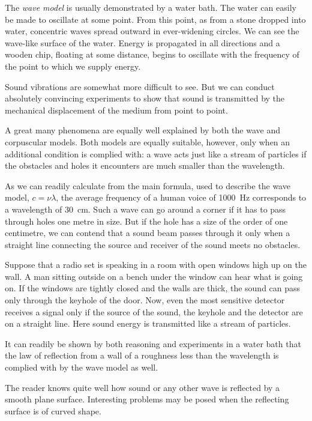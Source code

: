 The \emph{wave model} is usually demonstrated by a water bath. The water can easily be made to oscillate at some point. From this point, as from a stone dropped into water, concentric waves spread outward in ever-widening circles. We can see the wave-like surface of the water. Energy is propagated in all directions and a wooden chip, floating at some distance, begins to oscillate with the frequency of the point to which we supply energy.

Sound vibrations are somewhat more difficult to see. But we can conduct absolutely convincing experiments to show that sound is transmitted by the mechanical displacement of the medium from point to point.

A great many phenomena are equally well explained by both the wave and corpuscular models. Both models are equally suitable, however, only when an additional condition is complied with: a wave acts just like a stream of particles if the obstacles and holes it encounters are much smaller than the wavelength.

As we can readily calculate from the main formula, used to describe the wave model, $c = \nu \lambda$, the average frequency of a human voice of \SI{1000}{\hertz} corresponds to a wavelength of \SI{30}{\centi\meter}. Such a wave can go around a corner if it has to pass through holes one metre in size. But if the hole has a size of the order of one centimetre, we can contend that a sound beam passes through it only when a straight line connecting the source and receiver of the sound meets no obstacles.

Suppose that a radio set is speaking in a room with open windows high up on the wall. A man sitting outside on a bench under the window can hear what is going on. If the windows are tightly closed and the walls are thick, the sound can pass only through the keyhole of the door. Now, even the most sensitive detector receives a signal only if the source of the sound, the keyhole and the detector are on a straight line. Here sound energy is transmitted like a stream of particles.

It can readily be shown by both reasoning and experiments in a water bath that the law of reflection from a wall of a roughness less than the wavelength is complied with by the wave model as well.

The reader knows quite well how sound or any other wave is reflected by a smooth plane surface. Interesting problems may be posed when the reflecting surface is of curved shape.

